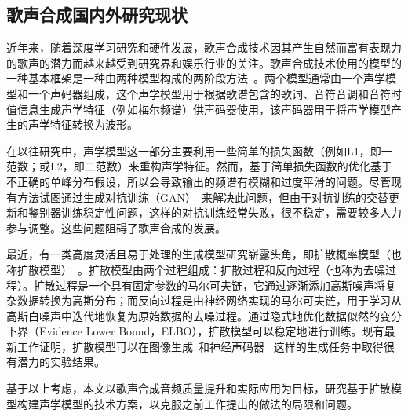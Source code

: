 \subsection{歌声合成国内外研究现状}
近年来，随着深度学习研究和硬件发展，歌声合成技术因其产生自然而富有表现力的歌声的潜力而越来越受到研究界和娱乐行业的关注。歌声合成技术使用的模型的一种基本框架是一种由两种模型构成的两阶段方法~\citep{nakamura2019singing,lee2019adversarially,blaauw2020sequence,ren2020deepsinger,chen2020hifisinger}。两个模型通常由一个声学模型和一个声码器组成，这个声学模型用于根据歌谱包含的歌词、音符音调和音符时值信息生成声学特征（例如梅尔频谱）供声码器使用，该声码器用于将声学模型产生的声学特征转换为波形。

在以往研究中，声学模型这一部分主要利用一些简单的损失函数（例如L1，即一范数；或L2，即二范数）来重构声学特征。然而，基于简单损失函数的优化基于不正确的单峰分布假设，所以会导致输出的频谱有模糊和过度平滑的问题。尽管现有方法试图通过生成对抗训练（GAN）~\citep{lee2019adversarially,chen2020hifisinger}来解决此问题，但由于对抗训练的交替更新和鉴别器训练稳定性问题，这样的对抗训练经常失败，很不稳定，需要较多人力参与调整。这些问题阻碍了歌声合成的发展。

最近，有一类高度灵活且易于处理的生成模型研究崭露头角，即扩散概率模型（也称扩散模型）~\citep{sohl2015deep,Ho2020ddpm,song2021denoising}。扩散模型由两个过程组成：扩散过程和反向过程（也称为去噪过程）。扩散过程是一个具有固定参数的马尔可夫链，它通过逐渐添加高斯噪声将复杂数据转换为高斯分布；而反向过程是由神经网络实现的马尔可夫链，用于学习从高斯白噪声中迭代地恢复为原始数据的去噪过程。通过隐式地优化数据似然的变分下界（Evidence Lower Bound，ELBO），扩散模型可以稳定地进行训练。现有最新工作证明，扩散模型可以在图像生成~\citep{Ho2020ddpm,song2021denoising}和神经声码器~
\citep{chen2021wavegrad,kong2021diffwave}这样的生成任务中取得很有潜力的实验结果。

基于以上考虑，本文以歌声合成音频质量提升和实际应用为目标，研究基于扩散模型构建声学模型的技术方案，以克服之前工作提出的做法的局限和问题。
